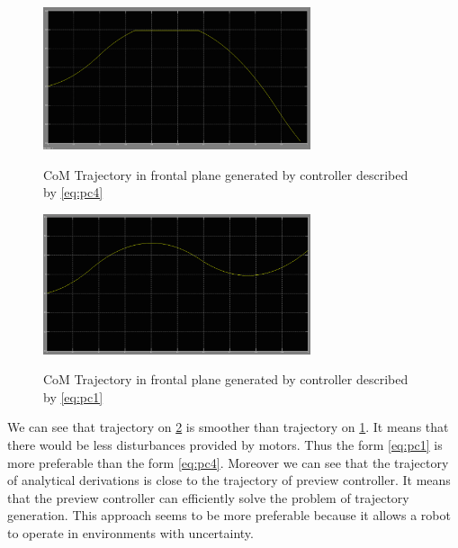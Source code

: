\documentclass[12pt,a4paper]{report}
\begin{document}
	 	\begin{figure}[H]
	 		\vspace{-0.2cm}
	 		\centering
	 		{\includegraphics[width=0.7\textwidth]{22}}
	 		\caption{CoM  Trajectory in frontal plane generated by controller described by \ref{eq:pc4}}
	 		\label{fig:22}
	 		\vspace{-0.1cm}
	 	\end{figure}
	 	\begin{figure}[H]
	 		\vspace{-0.2cm}
	 		\centering
	 		{\includegraphics[width=0.7\textwidth]{23}}
	 		\caption{CoM  Trajectory in frontal plane generated by controller described by \ref{eq:pc1}}
	 		\label{fig:23}
	 		\vspace{-0.1cm}
	 	\end{figure}
	 	
	 	We can see that trajectory on \cref{fig:23} is smoother than trajectory on \cref{fig:22}. It means that there would be less disturbances provided by motors. Thus the form \ref{eq:pc1} is more preferable than the form \ref{eq:pc4}.
	 	Moreover we can see that the trajectory of analytical derivations is close to the trajectory of preview controller. It means that the preview controller can efficiently solve the problem of trajectory generation. This approach seems to be more preferable because it allows a robot to operate in environments with uncertainty.
\end{document}
